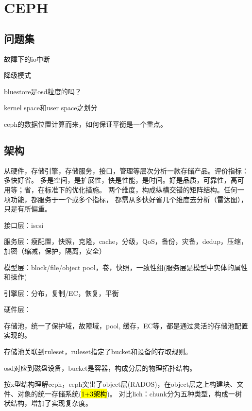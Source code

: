 \chapter{CEPH}

\section{问题集}

\begin{enumbox}
\item 故障下的io中断
\item 降级模式
\item bluestore是osd粒度的吗？
\item kernel space和user space之划分
\item ceph的数据位置计算而来，如何保证平衡是一个重点。
\end{enumbox}

\section{架构}

从硬件，存储引擎，存储服务，接口，管理等层次分析一款存储产品。评价指标：多快好省。
多是空间，是扩展性，快是性能，是时间。好是品质，可靠性，高可用等；省，在标准下的优化措施。
两个维度，构成纵横交错的矩阵结构。任何一项功能，都服务于一个或多个指标，
都需从多快好省几个维度去分析（雷达图），只是有所偏重。

\begin{enumbox}
\item 接口层：iscsi
\item 服务层：瘦配置，快照，克隆，cache，分级，QoS，备份，灾备，dedup，压缩，加密（缩减，保护，隔离，安全）
\item 模型层：block/file/object pool，卷，快照，一致性组(服务层是模型中实体的属性和操作)
\item 引擎层：分布，复制/EC，恢复，平衡
\item 硬件层：
\end{enumbox}

存储池，统一了保护域，故障域，pool, 缓存，EC等，都是通过灵活的存储池配置实现的。

存储池关联到ruleset，ruleset指定了bucket和设备的存取规则。

osd对应到磁盘设备，bucket是容器，构成分层的物理拓扑结构。

按x型结构理解ceph，ceph突出了object层(RADOS)，在object层之上构建块、文件、对象的统一存储系统(\hl{1+3架构})。
对比lich：chunk分为五种类型，构成一树状结构，增加了实现复杂度。

